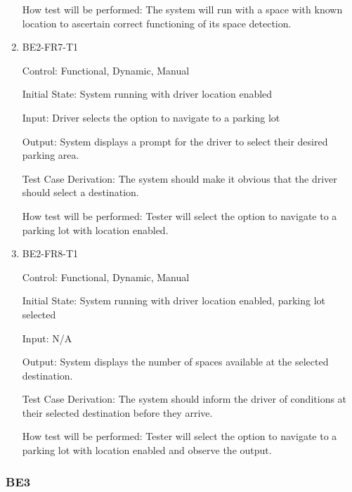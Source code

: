 \documentclass[12pt, titlepage]{article}
\begin{document}
\begin{enumerate}
How test will be performed: The system will run with a space with known location
to ascertain correct functioning of its space detection.

\item{BE2-FR7-T1}

Control: Functional, Dynamic, Manual
					
Initial State: System running with driver location enabled
					
Input: Driver selects the option to navigate to a parking lot
					
Output: System displays a prompt for the driver to select their desired parking
area.

Test Case Derivation: The system should make it obvious that the driver should
select a destination.
					
How test will be performed: Tester will select the option to navigate to a
parking lot with location enabled.

\item{BE2-FR8-T1}

Control: Functional, Dynamic, Manual
					
Initial State: System running with driver location enabled, parking lot selected
					
Input: N/A
					
Output: System displays the number of spaces available at the selected
destination.

Test Case Derivation: The system should inform the driver of conditions at their
selected destination before they arrive.
					
How test will be performed: Tester will select the option to navigate to a
parking lot with location enabled and observe the output.

\end{enumerate}

\subsubsection{BE3}
\end{document}
